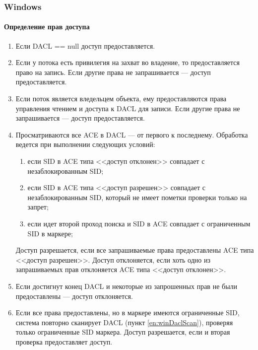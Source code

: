 \begin{frame}[allowframebreaks]
    \frametitle{Windows}
    \framesubtitle{Определение прав доступа}
    
    \begin{enumerate}
        \item Если DACL == null доступ предоставляется.
        
        \item Если у потока есть привилегия на захват во владение, то предоставляется право на запись. 
                Если другие права не запрашивается --- доступ предоставляется.
                
        \item Если поток является вледельцем объекта, ему предоставляются права управления чтением и 
                доступа к DACL для записи.
                Если другие права не запрашивается --- доступ предоставляется.
                
        \item \label{en:winDaclScan}Просматриваются все ACE в DACL --- от первого к последнему. 
                Обработка ведется при выполнении следующих условий:
                \begin{enumerate}
                    \item если SID в ACE типа <<доступ отклонен>> совпадает с незаблокированным SID;
                    \item если SID в ACE типа <<доступ разрешен>> совпадает с незаблокированным SID, 
                            который не имеет пометки проверки только на запрет;
                    \item если идет второй проход поиска и SID в ACE совпадает с ограниченным SID в маркере;
                \end{enumerate}
                
                Доступ разрешается, если все запрашиваемые права предоставлены ACE типа <<доступ разрешен>>.
                Доступ отклоняется, если хоть одно из запрашиваемых прав отклоняется ACE типа <<доступ отклонен>>.
        
        \item Если достигнут конец DACL и некоторые из запрошенных прав не были предоставлены --- доступ отклоняется.
        \item Если все права предоставлены, но в маркере имеются ограниченные SID, система повторно сканирует DACL 
                (пункт \ref{en:winDaclScan}),
                проверяя только ограниченные SID маркера. Доступ разрешается, если и вторая проверка предоставляет
                доступ.
    \end{enumerate}
\end{frame}


